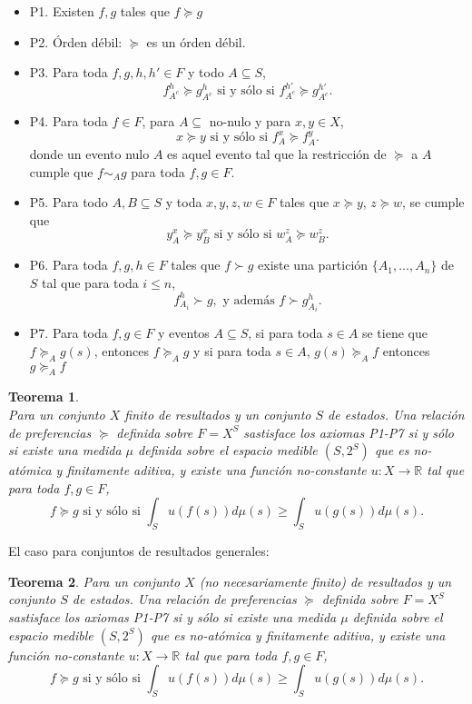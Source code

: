 \documentclass[11pt]{article}
\theoremstyle{plain}
\newtheorem{teo}{Teorema}
\begin{document}
\begin{itemize}
\item P1. Existen $f,g$ tales que $f \succeq g$
\item P2. Órden débil: $\succeq$ es un órden débil.
\item P3. Para toda $f,g,h,h' \in F$ y todo $A \subseteq S$,
\[ f_{A^c}^h \succeq g_{A^c}^h  \textrm{ si y sólo si }  f_{A^c}^{h'}  \succeq g_{A^c}^{h'} .\]
\item P4. Para toda $f \in F$, para $A \subseteq$ no-nulo y para $x,y \in X$,
 \[ x \succeq y \textrm{ si y sólo si } f_A^x \succeq f_A^y.  \]
donde un evento nulo $A$ es aquel evento tal que la restricción de $\succeq$ a $A$ cumple que $f \sim_A g$ para toda $f,g \in F$.
\item P5. Para todo $A,B \subseteq S$ y toda $x,y,z,w \in F$ tales que $x \succeq y$, $z \succeq w$, se cumple que
 \[ y_A^x \succeq y_B^x \textrm{ si y sólo si } w_A^z \succeq w_B^z.\]
\item P6. Para toda $f,g,h \in F$ tales que $f \succ g$ existe una partición $\{ A_1, ... , A_n \}$ de $S$ tal que para toda $ i \leq n$,
\[ f_{A_i}^h \succ g, \textrm{ y además } f \succ g_{A_i}^h. \]
\item P7. Para toda $f,g \in F$ y eventos $A \subseteq S$, si para toda $s \in A$ se tiene que $f \succeq_A g(s)$, entonces $f \succeq_A g$ y si para toda $s \in A$, $g(s) \succeq_A f$ entonces $g \succeq_A f$
\end{itemize}
\begin{teo}{\cite{savage1954the}}\\
Para un conjunto $X$ finito de resultados y un conjunto $S$ de estados. Una relación de preferencias $\succeq$ definida sobre $F=X^S$ sastisface los axiomas P1-P7 si y sólo si existe una medida $\mu$ definida sobre el espacio medible $(S, 2^S)$ que es no-atómica y finitamente aditiva, y existe una función no-constante $u :X \to \mathbb{R}$ tal que para toda $f,g \in F$,
\[ f \succeq g \textrm{ si y sólo si } \int_S u(f(s)) d \mu(s) \geq \int_S u(g(s)) d \mu(s). \]
\end{teo}
El caso para conjuntos de resultados generales:
\begin{teo}
Para un conjunto $X$ (no necesariamente finito) de resultados y un conjunto $S$ de estados. Una relación de preferencias $\succeq$ definida sobre $F=X^S$ sastisface los axiomas P1-P7 si y sólo si existe una medida $\mu$ definida sobre el espacio medible $(S, 2^S)$ que es no-atómica y finitamente aditiva, y existe una función no-constante $u :X \to \mathbb{R}$ tal que para toda $f,g \in F$,
\[ f \succeq g \textrm{ si y sólo si } \int_S u(f(s)) d \mu(s) \geq \int_S u(g(s)) d \mu(s). \]
\end{teo}
\end{document}
